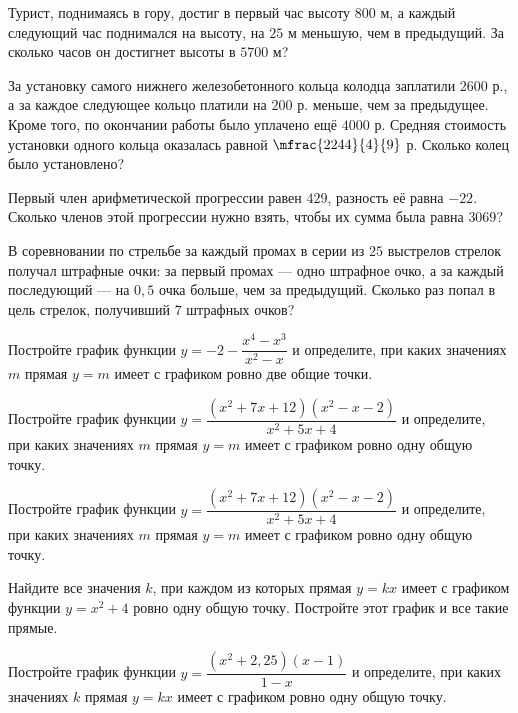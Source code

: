 \begin{class}[number=3]
	\begin{listofex}
		\item Турист, поднимаясь в гору, достиг в первый час высоту \( 800 \) м, а каждый следующий час поднимался на высоту, на \( 25 \) м меньшую, чем в предыдущий. За сколько часов он достигнет высоты в \( 5700 \) м?
		\item За установку самого нижнего железобетонного кольца колодца заплатили \( 2600 \) р., а за каждое следующее кольцо платили на \( 200 \) р. меньше, чем за предыдущее. Кроме того, по окончании работы было уплачено ещё \( 4000 \) р. Средняя стоимость установки одного кольца оказалась равной \( \mfrac{2244}{4}{9} \) р. Сколько колец было установлено?
		\item Первый член арифметической прогрессии равен \( 429 \), разность её равна \( -22 \). Сколько членов этой прогрессии нужно взять, чтобы их сумма была равна \( 3069 \)?
		\item В соревновании по стрельбе за каждый промах в серии из \( 25 \) выстрелов стрелок получал штрафные очки: за первый промах --- одно штрафное очко, а за каждый последующий --- на \( 0,5 \) очка больше, чем за предыдущий. Сколько раз попал в цель стрелок, получивший \( 7 \) штрафных очков?
		\item Постройте график функции \( y=-2-\dfrac{x^4-x^3}{x^2-x} \) и определите, при каких значениях \( m \) прямая \( y=m \) имеет с графиком ровно две общие точки.
		\item Постройте график функции \( y=\dfrac{(x^2+7x+12)(x^2-x-2)}{x^2+5x+4} \) и определите, при каких значениях \( m \) прямая \( y=m \) имеет с графиком ровно одну общую точку.
	\end{listofex}
\end{class}

\begin{class}[number=4]
	\begin{listofex}
		\item Постройте график функции \( y=\dfrac{(x^2+7x+12)(x^2-x-2)}{x^2+5x+4} \) и определите, при каких значениях \( m \) прямая \( y=m \) имеет с графиком ровно одну общую точку.
		\item Найдите все значения \( k \), при каждом из которых прямая \( y = kx \) имеет с графиком функции \( y = x^2+4 \) ровно одну общую точку. Постройте этот график и все такие прямые.
		\item Постройте график функции \( y=\dfrac{(x^2+2,25)(x-1)}{1-x} \) и определите, при каких значениях \( k \) прямая \( y=kx \) имеет с графиком ровно одну общую точку.
	\end{listofex}
\end{class}

